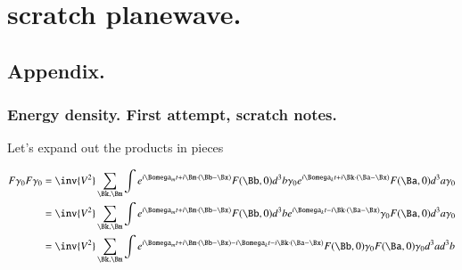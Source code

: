 
%
%




\chapter{scratch planewave.}
\label{chap:scratchPlanewave}
\date{ Feb dd, 2009.  $RCSfile: scratchPlanewave.tex,v $ Last $Revision: 1.8 $ $Date: 2009/06/14 23:51:45 $ }

%



\section{}

%


\section{Appendix. }
\subsection{Energy density.  First attempt, scratch notes. }

Let's expand out the products in pieces

\begin{align*}
F \gamma_0 F \gamma_0
&=
\inv{V^2} \sum_{\Bk,\Bm}
\int e^{i \Bomega_m t + i \Bm \cdot (\Bb-\Bx) } F(\Bb, 0) d^3 b \gamma_0
e^{i \Bomega_k t + i \Bk \cdot (\Ba-\Bx) } F(\Ba, 0) d^3 a \gamma_0 \\
&=
\inv{V^2} \sum_{\Bk,\Bm}
\int e^{i \Bomega_m t + i \Bm \cdot (\Bb-\Bx) } F(\Bb, 0) d^3 b
e^{i \Bomega_k t - i \Bk \cdot (\Ba-\Bx) } \gamma_0 F(\Ba, 0) d^3 a \gamma_0 \\
&=
\inv{V^2} \sum_{\Bk,\Bm}
\int e^{i \Bomega_m t + i \Bm \cdot (\Bb-\Bx) -i \Bomega_k t - i \Bk \cdot (\Ba-\Bx) } F(\Bb, 0) \gamma_0 F(\Ba, 0) \gamma_0 d^3 a d^3 b \\
\end{align*}

